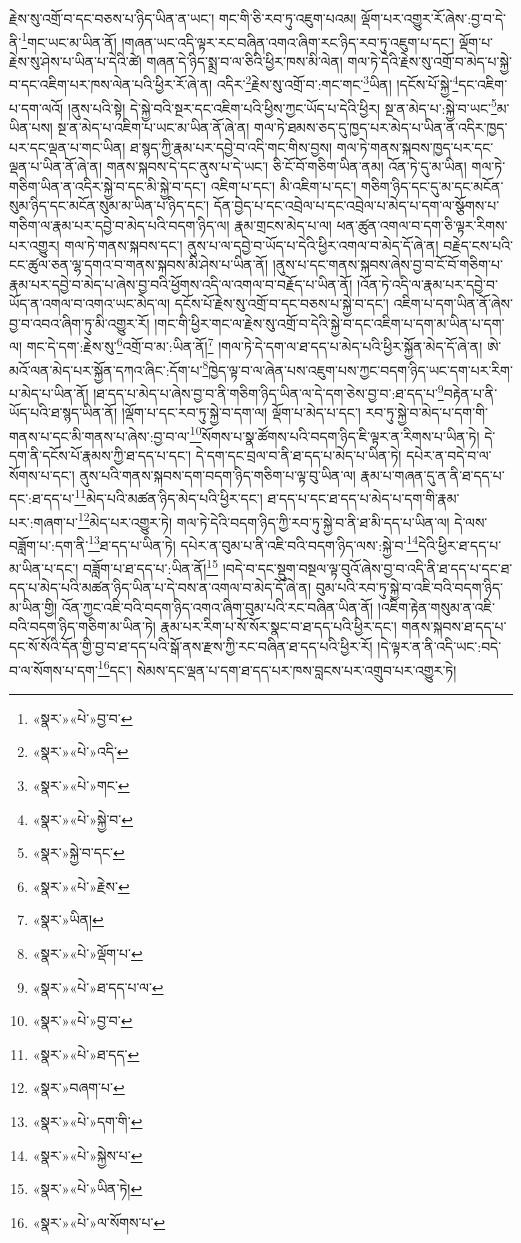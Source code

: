 རྗེས་སུ་འགྲོ་བ་དང་བཅས་པ་ཉིད་ཡིན་ན་ཡང་། གང་གི་ཅི་རབ་ཏུ་འཇུག་པའམ། ལྡོག་པར་འགྱུར་རོ་ཞེས་:བྱ་བ་དེ་ནི་\footnote{«སྣར་»«པེ་»བྱ་བ་}གང་ཡང་མ་ཡིན་ནོ། །གཞན་ཡང་འདི་ལྟར་རང་བཞིན་འགའ་ཞིག་རང་ཉིད་རབ་ཏུ་འཇུག་པ་དང་། ལྡོག་པ་རྗེས་སུ་ཤེས་པ་ཡིན་པ་དེའི་ཚེ། གཞན་དེ་ཉིད་སྨྲ་བ་ལ་ཅིའི་ཕྱིར་ཁས་མི་ལེན། གལ་ཏེ་དེའི་རྗེས་སུ་འགྲོ་བ་མེད་པ་སྐྱེ་བ་དང་འཇིག་པར་ཁས་ལེན་པའི་ཕྱིར་རོ་ཞེ་ན། འདིར་\footnote{«སྣར་»«པེ་»འདི་}རྗེས་སུ་འགྲོ་བ་:གང་གང་\footnote{«སྣར་»«པེ་»གང་}ཡིན། །དངོས་པོ་སྐྱེ་\footnote{«སྣར་»«པེ་»སྐྱེ་བ་}དང་འཇིག་པ་དག་ལའོ། །ནུས་པའི་སྟེ། དེ་སྐྱེ་བའི་སྔར་དང་འཇིག་པའི་ཕྱིས་ཀྱང་ཡོད་པ་དེའི་ཕྱིར། སྔ་ན་མེད་པ་:སྐྱེ་བ་ཡང་\footnote{«སྣར་»སྐྱེ་བ་དང་}མ་ཡིན་པས། སྔ་ན་མེད་པ་འཇིག་པ་ཡང་མ་ཡིན་ནོ་ཞེ་ན། གལ་ཏེ་ཐམས་ཅད་དུ་ཁྱད་པར་མེད་པ་ཡིན་ན་འདིར་ཁྱད་པར་དང་ལྡན་པ་གང་ཡིན། ཐ་སྙད་ཀྱི་རྣམ་པར་དབྱེ་བ་འདི་གང་གིས་བྱས། གལ་ཏེ་གནས་སྐབས་ཁྱད་པར་དང་ལྡན་པ་ཡིན་ནོ་ཞེ་ན། གནས་སྐབས་དེ་དང་ནུས་པ་དེ་ཡང་། ཅི་ངོ་བོ་གཅིག་ཡིན་ནམ། འོན་ཏེ་དུ་མ་ཡིན། གལ་ཏེ་གཅིག་ཡིན་ན་འདིར་སྐྱེ་བ་དང་མི་སྐྱེ་བ་དང་། འཇིག་པ་དང་། མི་འཇིག་པ་དང་། གཅིག་ཉིད་དང་དུ་མ་དང་མངོན་སུམ་ཉིད་དང་མངོན་སུམ་མ་ཡིན་པ་ཉིད་དང་། དོན་བྱེད་པ་དང་འབྲེལ་པ་དང་འབྲེལ་པ་མེད་པ་དག་ལ་སྩོགས་པ་གཅིག་ལ་རྣམ་པར་དབྱེ་བ་མེད་པའི་བདག་ཉིད་ལ། རྣམ་གྲངས་མེད་པ་ལ། ཕན་ཚུན་འགལ་བ་དག་ཅི་ལྟར་རིགས་པར་འགྱུར། གལ་ཏེ་གནས་སྐབས་དང་། ནུས་པ་ལ་དབྱེ་བ་ཡོད་པ་དེའི་ཕྱིར་འགལ་བ་མེད་དོ་ཞེ་ན། བརྗེད་ངས་པའི་ངང་ཚུལ་ཅན་ལྷ་དགའ་བ་གནས་སྐབས་མི་ཤེས་པ་ཡིན་ནོ། །ནུས་པ་དང་གནས་སྐབས་ཞེས་བྱ་བ་ངོ་བོ་གཅིག་པ་རྣམ་པར་དབྱེ་བ་མེད་པ་ཞེས་བྱ་བའི་ཕྱོགས་འདི་ལ་འགལ་བ་བརྗོད་པ་ཡིན་ནོ། །འོན་ཏེ་འདི་ལ་རྣམ་པར་དབྱེ་བ་ཡོད་ན་འགལ་བ་འགའ་ཡང་མེད་ལ། དངོས་པོ་རྗེས་སུ་འགྲོ་བ་དང་བཅས་པ་སྐྱེ་བ་དང་། འཇིག་པ་དག་ཡིན་ནོ་ཞེས་བྱ་བ་འབའ་ཞིག་ཏུ་མི་འགྱུར་རོ། །གང་གི་ཕྱིར་གང་ལ་རྗེས་སུ་འགྲོ་བ་དེའི་སྐྱེ་བ་དང་འཇིག་པ་དག་མ་ཡིན་པ་དག་ལ། གང་དེ་དག་:རྗེས་སུ་\footnote{«སྣར་»«པེ་»རྗེས་}འགྲོ་བ་མ་:ཡིན་ནོ།\footnote{«སྣར་»ཡིན།} །གལ་ཏེ་དེ་དག་ལ་ཐ་དད་པ་མེད་པའི་ཕྱིར་སྐྱོན་མེད་དོ་ཞེ་ན། ཨེ་མའོ་ལན་མེད་པར་སྐྱོན་དཀའ་ཞིང་:དོག་པ་\footnote{«སྣར་»«པེ་»ལྡོག་པ་}ཁྱེད་ལྟ་བ་ལ་ཞེན་པས་འཇུག་པས་ཀྱང་བདག་ཉིད་ཡང་དག་པར་རིག་པ་མེད་པ་ཡིན་ནོ། །ཐ་དད་པ་མེད་པ་ཞེས་བྱ་བ་ནི་གཅིག་ཉིད་ཡིན་ལ་དེ་དག་ཅེས་བྱ་བ་:ཐ་དད་པ་\footnote{«སྣར་»«པེ་»ཐ་དད་པ་ལ་}བརྟེན་པ་ནི་ཡོད་པའི་ཐ་སྙད་ཡིན་ནོ། །ལྡོག་པ་དང་རབ་ཏུ་སྐྱེ་བ་དག་ལ། ལྡོག་པ་མེད་པ་དང་། རབ་ཏུ་སྐྱེ་བ་མེད་པ་དག་གི་གནས་པ་དང་མི་གནས་པ་ཞེས་:བྱ་བ་ལ་\footnote{«སྣར་»«པེ་»བྱ་བ་}སོགས་པ་སྣ་ཚོགས་པའི་བདག་ཉིད་ཇི་ལྟར་ན་རིགས་པ་ཡིན་ཏེ། དེ་དག་ནི་དངོས་པོ་རྣམས་ཀྱི་ཐ་དད་པ་དང་། དེ་དག་དང་བྲལ་བ་ནི་ཐ་དད་པ་མེད་པ་ཡིན་ཏེ། དཔེར་ན་བདེ་བ་ལ་སོགས་པ་དང་། ནུས་པའི་གནས་སྐབས་དག་བདག་ཉིད་གཅིག་པ་ལྟ་བུ་ཡིན་ལ། རྣམ་པ་གཞན་དུ་ན་ནི་ཐ་དད་པ་དང་:ཐ་དད་པ་\footnote{«སྣར་»«པེ་»ཐ་དད་}མེད་པའི་མཚན་ཉིད་མེད་པའི་ཕྱིར་དང་། ཐ་དད་པ་དང་ཐ་དད་པ་མེད་པ་དག་གི་རྣམ་པར་:གཞག་པ་\footnote{«སྣར་»བཞག་པ་}མེད་པར་འགྱུར་ཏེ། གལ་ཏེ་དེའི་བདག་ཉིད་ཀྱི་རབ་ཏུ་སྐྱེ་བ་ནི་ཐ་མི་དད་པ་ཡིན་ལ། དེ་ལས་བཟློག་པ་:དག་ནི་\footnote{«སྣར་»«པེ་»དག་གི་}ཐ་དད་པ་ཡིན་ཏེ། དཔེར་ན་བུམ་པ་ནི་འཇི་བའི་བདག་ཉིད་ལས་:སྐྱེ་བ་\footnote{«སྣར་»«པེ་»སྐྱེས་པ་}དེའི་ཕྱིར་ཐ་དད་པ་མ་ཡིན་པ་དང་། བཟློག་པ་ཐ་དད་པ་:ཡིན་ནོ།\footnote{«སྣར་»«པེ་»ཡིན་ཏེ།} །བདེ་བ་དང་སྡུག་བསྔལ་ལྟ་བུའོ་ཞེས་བྱ་བ་འདི་ནི་ཐ་དད་པ་དང་ཐ་དད་པ་མེད་པའི་མཚན་ཉིད་ཡིན་པ་དེ་བས་ན་འགལ་བ་མེད་དོ་ཞེ་ན། བུམ་པའི་རབ་ཏུ་སྐྱེ་བ་འཇི་བའི་བདག་ཉིད་མ་ཡིན་གྱི། འོན་ཀྱང་འཇི་བའི་བདག་ཉིད་འགའ་ཞིག་བུམ་པའི་རང་བཞིན་ཡིན་ནོ། །འཇིག་རྟེན་གསུམ་ན་འཇི་བའི་བདག་ཉིད་གཅིག་མ་ཡིན་ཏེ། རྣམ་པར་རིག་པ་སོ་སོར་སྣང་བ་ཐ་དད་པའི་ཕྱིར་དང་། གནས་སྐབས་ཐ་དད་པ་དང་སོ་སོའི་དོན་གྱི་བྱ་བ་ཐ་དད་པའི་སྒོ་ནས་རྫས་ཀྱི་རང་བཞིན་ཐ་དད་པའི་ཕྱིར་རོ། །དེ་ལྟར་ན་ནི་འདི་ཡང་:བདེ་བ་ལ་སོགས་པ་དག་\footnote{«སྣར་»«པེ་»ལ་སོགས་པ་}དང་། སེམས་དང་ལྡན་པ་དག་ཐ་དད་པར་ཁས་བླངས་པར་འགྲུབ་པར་འགྱུར་ཏེ། 